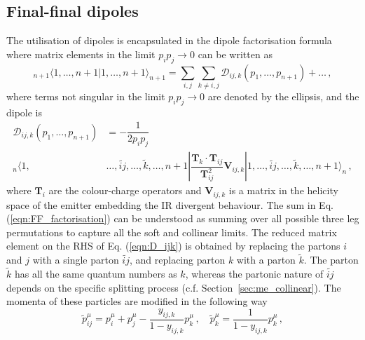 \documentclass[main.tex]{subfiles}
\begin{document}
    \subsection{Final-final dipoles}
        The utilisation of dipoles is encapsulated in the
        dipole factorisation formula where matrix elements in the limit
        $p_{i}p_{j} \rightarrow 0$ can be written as
        \begin{equation}\label{eqn:FF_factorisation}
            {}_{n+1} \langle 1, \ldots, n+1 | 1, \ldots, n+1 \rangle_{n+1} = \sum_{i,j}\sum_{k\neq i,j}\mathcal{D}_{ij,k}(p_{1},\ldots,p_{n+1}) + \ldots \, ,
        \end{equation}
        where terms not singular in the limit $p_{i}p_{j} \rightarrow 0$
        are denoted by the ellipsis, and the dipole is
        \begin{equation}\label{eqn:D_ijk}
            \begin{split}
                \mathcal{D}_{ij,k}(p_{1},\ldots,p_{n+1}) &= -\dfrac{1}{2p_{i}p_{j}} \\
                {}_{n}\langle 1, &\ldots, \widetilde{ij}, \ldots, \tilde{k}, \ldots, n+1 | \dfrac{\boldsymbol{T}_{k} \cdot \boldsymbol{T}_{ij}}{\boldsymbol{T}_{ij}^{2}} \boldsymbol{V}_{ij,k} | 1, \ldots, \widetilde{ij}, \ldots, \tilde{k}, \ldots, n+1 \rangle_{n} \, ,
            \end{split}
        \end{equation}
        where $\boldsymbol{T}_{i}$ are the colour-charge operators and $\boldsymbol{V}_{ij,k}$
        is a matrix in the helicity space of the emitter embedding the
        IR divergent behaviour.
        The sum in Eq. (\ref{eqn:FF_factorisation}) can be understood as summing over all possible
        three leg permutations to capture all the soft and collinear limits.
        The reduced matrix element on the RHS of Eq. (\ref{eqn:D_ijk})
        is obtained by replacing the partons $i$ and $j$ with
        a single parton $\widetilde{ij}$, and replacing parton
        $k$ with a parton $\tilde{k}$. The parton $\tilde{k}$ has all the
        same quantum numbers as $k$, whereas the
        partonic nature of $\widetilde{ij}$ depends on
        the specific splitting process (c.f. Section~\ref{sec:me_collinear}).
        The momenta of these particles are modified in the following way
        \begin{equation}\label{eqn:FF_mapping}
            \tilde{p}_{ij}^{\mu} = p_{i}^{\mu} + p_{j}^{\mu} - \dfrac{y_{ij,k}}{1-y_{ij,k}} p_{k}^{\mu} \, , \quad \tilde{p}_{k}^{\mu} = \dfrac{1}{1-y_{ij,k}}p_{k}^{\mu} \, ,
        \end{equation}
\end{document}
